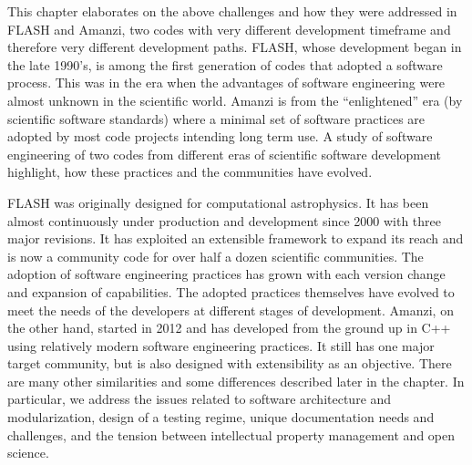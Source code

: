 This chapter elaborates on the above challenges and how they were
addressed in FLASH and Amanzi, two codes with very  
different development timeframe and therefore very different
development paths. FLASH, whose development began in the late 1990's,
is among the first generation of codes that
adopted a software process. This was in the era when the advantages of
software engineering were almost unknown in the scientific
world. Amanzi is from the ``enlightened'' era (by scientific software
standards) where a minimal set of software practices are adopted by
most code projects intending long term use. A study of software
engineering of two codes from different eras of scientific software
development highlight, how these practices  and the communities have
evolved.    

FLASH was originally designed for computational
astrophysics. It has been almost continuously 
under production and development since 2000 with three major
revisions. It has exploited an extensible framework to expand its
reach and is now a community code for over half a dozen scientific
communities. The adoption of software engineering practices has
grown with each version change and expansion of capabilities. The
adopted practices themselves have evolved to meet the needs of the
developers at different stages of development. Amanzi, on the other
hand, started in 2012 and has developed 
from the ground up in C++ using relatively modern software engineering
practices. It still has one major target community, but is also
designed with extensibility as an objective. There are many other
similarities and some differences described later in the chapter.
In particular, we address the issues related to software
architecture and modularization, design of a testing regime,
unique documentation needs and challenges, and the tension between intellectual property
management and open science.

 

